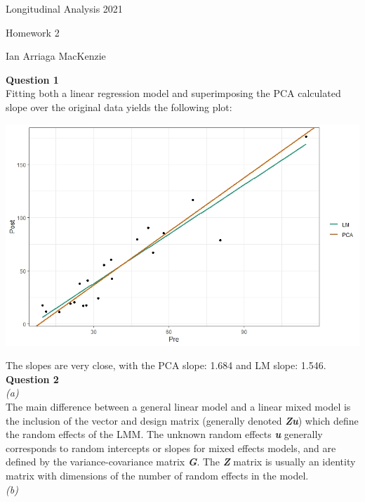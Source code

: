 \documentclass[11pt,a4paper]{article}
\begin{document}
\begin{flushright}
Longitudinal Analysis 2021

Homework 2

Ian Arriaga MacKenzie
\end{flushright}

\textbf{Question 1}\\

Fitting both a linear regression model and superimposing the PCA calculated slope over the original data yields the following plot:

\begin{center}
\includegraphics[scale=0.7]{pca_plot.jpeg}
\end{center}

The slopes are very close, with the PCA slope: 1.684 and LM slope: 1.546.\\

\textbf{Question 2}\\

\textit{(a)}\\

The main difference between a general linear model and a linear mixed model is the inclusion of the vector and design matrix (generally denoted \textbf{\textit{Zu}}) which define the random effects of the LMM. The unknown random effects \textbf{\textit{u}} generally corresponds to random intercepts or slopes for mixed effects models, and are defined by the variance-covariance matrix \textbf{\textit{G}}. The \textbf{\textit{Z}} matrix is usually an identity matrix with dimensions of the number of random effects in the model.\\

\textit{(b)}\\
\end{document}
